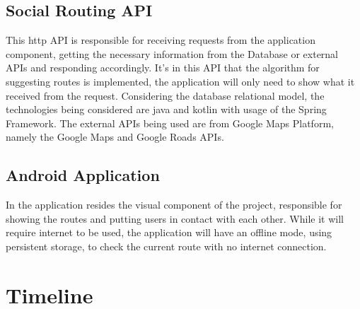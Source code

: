 \documentclass{article}
\begin{document}
        \subsection*{Social Routing API}
            This http API is responsible for receiving requests from the application component, getting the necessary information from the Database or external APIs
            and responding accordingly. It's in this API that the algorithm for suggesting routes is implemented, the application will only need to show what it
            received from the request.
            Considering the database relational model, the technologies being considered are java and kotlin with usage of the Spring Framework. 
            The external APIs being used are from Google Maps Platform, namely the Google Maps and Google Roads APIs.  

        \subsection*{Android Application}
            In the application resides the visual component of the project, responsible for showing the routes and putting users in contact with each other.
            While it will require internet to be used, the application will have an offline mode, using persistent storage, to check the current route with no internet connection.

    \section{Timeline}   
\end{document}
